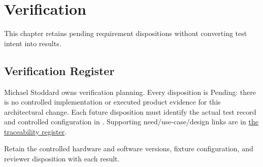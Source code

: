 \chapter{Verification}
\label{Section:VerificationResponsibility}
This chapter retains pending requirement dispositions without converting test intent into results.


\section{Verification Register}
Michael Stoddard owns verification planning. Every disposition is Pending: there is no controlled implementation or executed product evidence for this architectural change. Each future disposition must identify the actual test record and controlled configuration in . Supporting need/use-case/design links are in \hyperref[Table:TraceabilityMatrix]{the traceability register}.

Retain the controlled hardware and software versions, fixture configuration, and reviewer disposition with each result.

